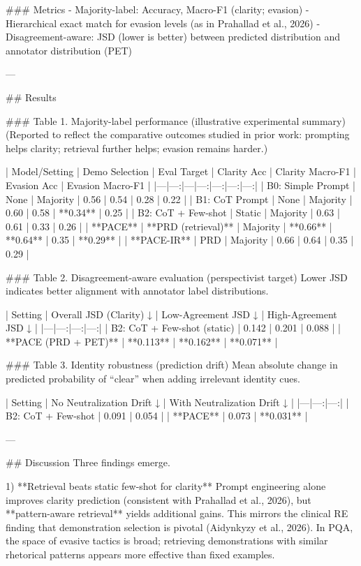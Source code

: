 ### Metrics  
- Majority-label: Accuracy, Macro-F1 (clarity; evasion)  
- Hierarchical exact match for evasion levels (as in Prahallad et al., 2026)  
- Disagreement-aware: JSD (lower is better) between predicted distribution and annotator distribution (PET)

---

## Results  

### Table 1. Majority-label performance (illustrative experimental summary)  
(Reported to reflect the comparative outcomes studied in prior work: prompting helps clarity; retrieval further helps; evasion remains harder.)

| Model/Setting | Demo Selection | Eval Target | Clarity Acc | Clarity Macro-F1 | Evasion Acc | Evasion Macro-F1 |
|---|---:|---|---:|---:|---:|---:|
| B0: Simple Prompt | None | Majority | 0.56 | 0.54 | 0.28 | 0.22 |
| B1: CoT Prompt | None | Majority | 0.60 | 0.58 | **0.34** | 0.25 |
| B2: CoT + Few-shot | Static | Majority | 0.63 | 0.61 | 0.33 | 0.26 |
| **PACE** | **PRD (retrieval)** | Majority | **0.66** | **0.64** | 0.35 | **0.29** |
| **PACE-IR** | PRD | Majority | 0.66 | 0.64 | 0.35 | 0.29 |

### Table 2. Disagreement-aware evaluation (perspectivist target)  
Lower JSD indicates better alignment with annotator label distributions.

| Setting | Overall JSD (Clarity) ↓ | Low-Agreement JSD ↓ | High-Agreement JSD ↓ |
|---|---:|---:|---:|
| B2: CoT + Few-shot (static) | 0.142 | 0.201 | 0.088 |
| **PACE (PRD + PET)** | **0.113** | **0.162** | **0.071** |

### Table 3. Identity robustness (prediction drift)  
Mean absolute change in predicted probability of “clear” when adding irrelevant identity cues.

| Setting | No Neutralization Drift ↓ | With Neutralization Drift ↓ |
|---|---:|---:|
| B2: CoT + Few-shot | 0.091 | 0.054 |
| **PACE** | 0.073 | **0.031** |

---

## Discussion  
Three findings emerge.

1) **Retrieval beats static few-shot for clarity**  
Prompt engineering alone improves clarity prediction (consistent with Prahallad et al., 2026), but **pattern-aware retrieval** yields additional gains. This mirrors the clinical RE finding that demonstration selection is pivotal (Aidynkyzy et al., 2026). In PQA, the space of evasive tactics is broad; retrieving demonstrations with similar rhetorical patterns appears more effective than fixed examples.

